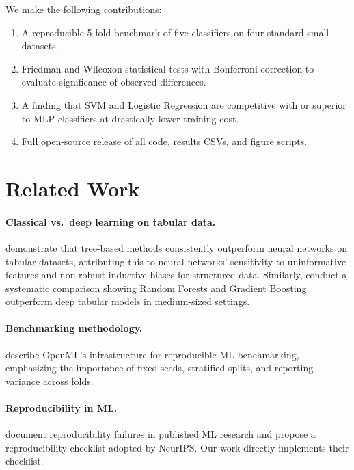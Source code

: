 \documentclass[10pt,twocolumn]{article}
\begin{document}
We make the following contributions:
\begin{enumerate}
  \item A reproducible 5-fold benchmark of five classifiers on four standard small datasets.
  \item Friedman and Wilcoxon statistical tests with Bonferroni correction to evaluate 
        significance of observed differences.
  \item A finding that SVM and Logistic Regression are competitive with or superior to 
        MLP classifiers at drastically lower training cost.
  \item Full open-source release of all code, results CSVs, and figure scripts.
\end{enumerate}

\section{Related Work}

\paragraph{Classical vs.\ deep learning on tabular data.}
\citet{grinsztajn2022tree} demonstrate that tree-based methods consistently outperform 
neural networks on tabular datasets, attributing this to neural networks' sensitivity to 
uninformative features and non-robust inductive biases for structured data.
Similarly, \citet{shwartz2022tabular} conduct a systematic comparison showing Random 
Forests and Gradient Boosting outperform deep tabular models in medium-sized settings.

\paragraph{Benchmarking methodology.}
\citet{bischl2021openml} describe OpenML's infrastructure for reproducible ML benchmarking, 
emphasizing the importance of fixed seeds, stratified splits, and reporting variance 
across folds.

\paragraph{Reproducibility in ML.}
\citet{pineau2021improving} document reproducibility failures in published ML research and 
propose a reproducibility checklist adopted by NeurIPS. Our work directly implements 
their checklist.
\end{document}
